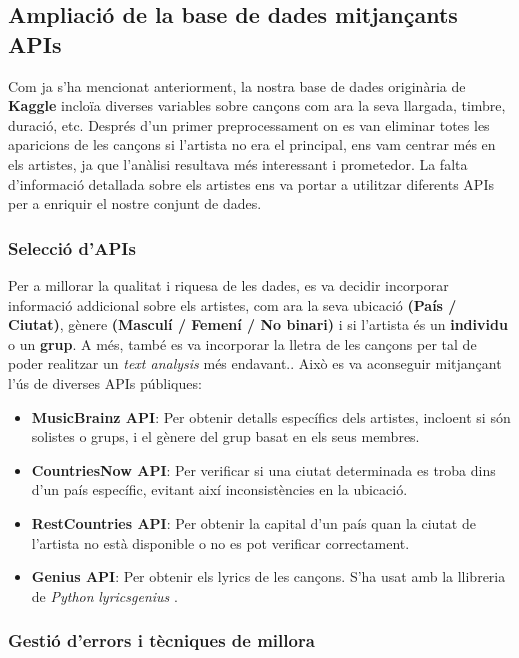 \subsection{Ampliació de la base de dades mitjançants APIs}

Com ja s'ha mencionat anteriorment, la nostra base de dades originària de \textbf{Kaggle} incloïa diverses variables sobre cançons com ara la seva llargada, timbre, duració, etc. Després d'un primer preprocessament on es van eliminar totes les aparicions de les cançons si l'artista no era el principal, ens vam centrar més en els artistes, ja que l'anàlisi resultava més interessant i prometedor. La falta d'informació detallada sobre els artistes ens va portar a utilitzar diferents APIs per a enriquir el nostre conjunt de dades.

\subsubsection{Selecció d'APIs}

Per a millorar la qualitat i riquesa de les dades, es va decidir incorporar informació addicional sobre els artistes, com ara la seva ubicació \textbf{(País / Ciutat)}, gènere \textbf{(Masculí / Femení / No binari)} i si l'artista és un \textbf{individu} o un \textbf{grup}. A més, també es va incorporar la lletra de les cançons per tal de poder realitzar un \textit{text analysis} més endavant.. Això es va aconseguir mitjançant l'ús de diverses APIs públiques:
\begin{itemize}
    \item \textbf{MusicBrainz API}: Per obtenir detalls específics dels artistes, incloent si són solistes o grups, i el gènere del grup basat en els seus membres.
    \item \textbf{CountriesNow API}: Per verificar si una ciutat determinada es troba dins d'un país específic, evitant així inconsistències en la ubicació.
    \item \textbf{RestCountries API}: Per obtenir la capital d'un país quan la ciutat de l'artista no està disponible o no es pot verificar correctament.
    \item \textbf{Genius API}: Per obtenir els lyrics de les cançons. S'ha usat amb la llibreria de \textit{Python} \textit{lyricsgenius} .
\end{itemize}

\subsubsection{Gestió d'errors i tècniques de millora}

